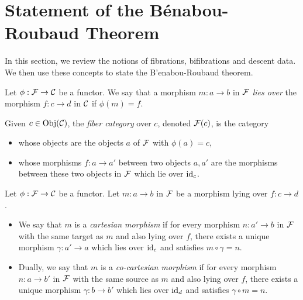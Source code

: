 \documentclass{amsart}
\begin{document}
\section{Statement of the B\'enabou-Roubaud Theorem}
    In this section, we review the notions of fibrations,
        bifibrations and descent data.
    We then use these concepts to state the B'enabou-Roubaud theorem.
\begin{definition}
    Let $\phi:\mathcal F \to \mathcal C$ be a functor.
    We say that a morphism $m:a\to b$ in $\mathcal F$
        \emph{lies over} the morphism $f:c\to d$ in $\mathcal C$
        if $\phi(m)=f$.
    
    Given $c\in \operatorname{Obj}(\mathcal C)$, the \emph{fiber category} over $c$,
        denoted $\mathcal F(c)$,
        is the category 
    \begin{itemize}
        \item whose objects are the objects $a$ of $\mathcal F$
            with $\phi(a)=c$,
        \item whose morphisms $f:a\to a'$ 
            between two objects $a,a'$ are the morphisms 
            between these two objects in $\mathcal F$
            which lie over $\operatorname{id}_c$.
    \end{itemize}
\end{definition}
\begin{definition}
    Let $\phi:\mathcal F\to \mathcal C$ be a functor.
    Let $m:a\to b$ in $\mathcal F$ be a morphism lying over
        $f:c\to d$.
    \begin{itemize}
    \item We say that $m$ is a \emph{cartesian morphism}
        if for every morphism $n:a'\to b$ in $\mathcal F$ with the same target as $m$ and also lying over $f$,
        there exists a unique morphism $\gamma : a'\to a$
        which lies over $\operatorname{id}_c$
        and satisfies $m\circ \gamma=n$.
    \item Dually, we say that $m$ is a \emph{co-cartesian morphism}
        if for every morphism $n:a\to b'$ in $\mathcal F$ with the same source as $m$ and also lying over
            $f$,
        there exists a unique morphism $\gamma:b\to b'$
            which lies over $\operatorname{id}_d$ and satisfies $\gamma\circ m=n$.
    \end{itemize}
\end{definition}
\end{document}
